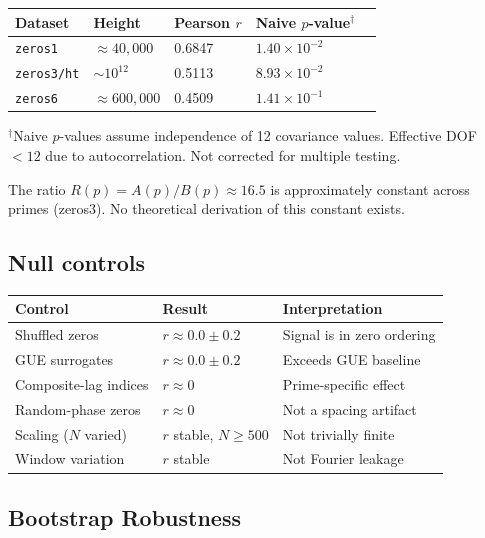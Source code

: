 \documentclass[11pt]{article}
\begin{document}
\begin{center}
\begin{tabular}{lllll}
\toprule
Dataset & Height & Pearson $r$ & Naive $p$-value$^\dagger$ \\
\midrule
\texttt{zeros1} & $\approx 40{,}000$ & 0.6847 & $1.40\times10^{-2}$ \\
\texttt{zeros3/ht} & $\sim 10^{12}$   & 0.5113 & $8.93\times10^{-2}$ \\
\texttt{zeros6} & $\approx 600{,}000$ & 0.4509 & $1.41\times10^{-1}$ \\


\bottomrule
\end{tabular}

\medskip\small $^\dagger$Naive $p$-values assume independence of 12 covariance values.
Effective DOF $<12$ due to autocorrelation. Not corrected for multiple testing.
\end{center}

The ratio $R(p) = A(p)/B(p) \approx 16.5$ is approximately constant
across primes (zeros3). No theoretical derivation of this constant exists.

\subsection{Null controls}

\begin{center}
\begin{tabular}{lll}
\toprule
Control & Result & Interpretation \\
\midrule
Shuffled zeros        & $r \approx 0.0 \pm 0.2$ & Signal is in zero ordering \\
GUE surrogates        & $r \approx 0.0 \pm 0.2$ & Exceeds GUE baseline \\
Composite-lag indices & $r \approx 0$           & Prime-specific effect \\
Random-phase zeros    & $r \approx 0$           & Not a spacing artifact \\
Scaling ($N$ varied)  & $r$ stable, $N\geq500$  & Not trivially finite \\
Window variation      & $r$ stable              & Not Fourier leakage \\
\bottomrule
\end{tabular}
\end{center}


\subsection{Bootstrap Robustness}
\end{document}
